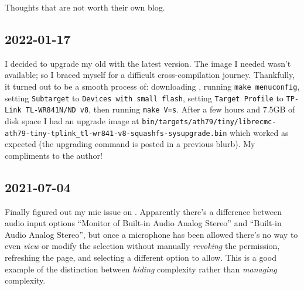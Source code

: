 \documentclass{article}
\begin{document}
Thoughts that are not worth their own blog.

\subsection{2022-01-17}
I decided to upgrade my old  with the latest  version.  The image I needed wasn't available; so I braced myself for a difficult cross-compilation journey.  Thankfully, it turned out to be a smooth process of: downloading , running \texttt{make menuconfig}, setting \texttt{Subtarget} to \texttt{Devices with small flash}, setting \texttt{Target Profile} to \texttt{TP-Link TL-WR841N/ND v8}, then running \texttt{make V=s}.  After a few hours and 7.5GB of disk space I had an upgrade image at \texttt{bin/targets/ath79/tiny/librecmc-ath79-tiny-tplink_tl-wr841-v8-squashfs-sysupgrade.bin} which worked as expected (the upgrading command is posted in a previous blurb).  My compliments to the author!

\subsection{2021-07-04}
Finally figured out my mic issue on .  Apparently there's a difference between audio input options ``Monitor of Built-in Audio Analog Stereo'' and ``Built-in Audio Analog Stereo'', but once a microphone has been allowed there's no way to even \emph{view} or modify the selection without manually \emph{revoking} the permission, refreshing the page, and selecting a different option to allow.  This is a good example of the distinction between \emph{hiding} complexity rather than \emph{managing} complexity.
\end{document}
